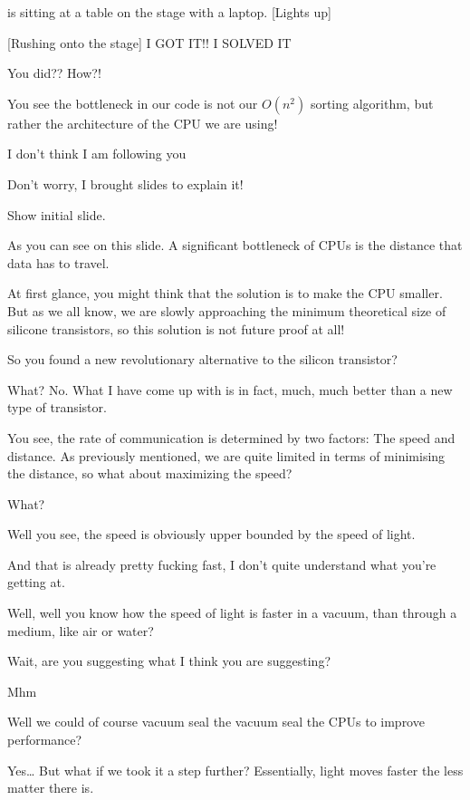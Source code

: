 \documentclass{article}
\begin{document}
\newpage%
\begin{sketch}
\scene{}
 is sitting at a table on the stage with a laptop.
[Lights up]

[Rushing onto the stage]
I GOT IT!! I SOLVED IT

You did?? How?!

You see the bottleneck in our code is not our $O(n^2)$ sorting algorithm, but rather the architecture of the CPU we are using! 

I don’t think I am following you

Don’t worry, I brought slides to explain it!

 Show initial slide.

As you can see on this slide. A significant bottleneck of CPUs is the distance that data has to travel.

At first glance, you might think that the solution is to make the CPU smaller. But as we all know, we are slowly approaching the minimum theoretical size of silicone transistors, so this solution is not future proof at all!

So you found a new revolutionary alternative to the silicon transistor?

What? No. What I have come up with is in fact, much, much better than a new type of transistor.

You see, the rate of communication is determined by two factors: The speed and distance. As previously mentioned, we are quite limited in terms of minimising the distance, so what about maximizing the speed?

 What?

Well you see, the speed is obviously upper bounded by the speed of light.

And that is already pretty fucking fast, I don’t quite understand what you’re getting at.

Well, well you know how the speed of light is faster in a vacuum, than through a medium, like air or water?

Wait, are you suggesting what I think you are suggesting?

Mhm

Well we could of course vacuum seal the vacuum seal the CPUs to improve performance?

Yes… But what if we took it a step further? Essentially, light moves faster the less matter there is.


\end{sketch}
\end{document}
